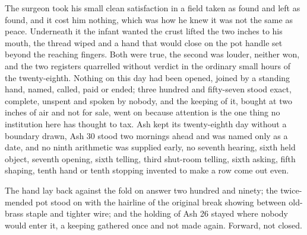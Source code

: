 The surgeon took his small clean satisfaction in a field taken as found and left as found, and it cost him nothing, which was how he knew it was not the same as peace. Underneath it the infant wanted the crust lifted the two inches to his mouth, the thread wiped and a hand that would close on the pot handle set beyond the reaching fingers. Both were true, the second was louder, neither won, and the two registers quarrelled without verdict in the ordinary small hours of the twenty-eighth. Nothing on this day had been opened, joined by a standing hand, named, called, paid or ended; three hundred and fifty-seven stood exact, complete, unspent and spoken by nobody, and the keeping of it, bought at two inches of air and not for sale, went on because attention is the one thing no institution here has thought to tax. Ash kept its twenty-eighth day without a boundary drawn, Ash 30 stood two mornings ahead and was named only as a date, and no ninth arithmetic was supplied early, no seventh hearing, sixth held object, seventh opening, sixth telling, third shut-room telling, sixth asking, fifth shaping, tenth hand or tenth stopping invented to make a row come out even.

The hand lay back against the fold on answer two hundred and ninety; the twice-mended pot stood on  with the hairline of the original break showing between old-brass staple and tighter wire; and the holding of Ash 26 stayed where nobody would enter it, a keeping gathered once and not made again. Forward, not closed.

